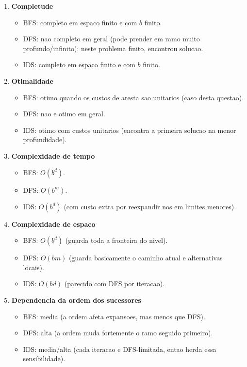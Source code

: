 \begin{enumerate}[label=\alph*)]
  \item \textbf{Completude}
  \begin{itemize}[leftmargin=1.5em]
    \item BFS: completo em espaco finito e com $b$ finito.
    \item DFS: nao completo em geral (pode prender em ramo muito profundo/infinito); neste problema finito, encontrou solucao.
    \item IDS: completo em espaco finito e com $b$ finito.
  \end{itemize}

  \item \textbf{Otimalidade}
  \begin{itemize}[leftmargin=1.5em]
    \item BFS: otimo quando os custos de aresta sao unitarios (caso desta questao).
    \item DFS: nao e otimo em geral.
    \item IDS: otimo com custos unitarios (encontra a primeira solucao na menor profundidade).
  \end{itemize}

  \item \textbf{Complexidade de tempo}
  \begin{itemize}[leftmargin=1.5em]
    \item BFS: $O(b^d)$.
    \item DFS: $O(b^m)$.
    \item IDS: $O(b^d)$ (com custo extra por reexpandir nos em limites menores).
  \end{itemize}

  \item \textbf{Complexidade de espaco}
  \begin{itemize}[leftmargin=1.5em]
    \item BFS: $O(b^d)$ (guarda toda a fronteira do nivel).
    \item DFS: $O(bm)$ (guarda basicamente o caminho atual e alternativas locais).
    \item IDS: $O(bd)$ (parecido com DFS por iteracao).
  \end{itemize}

  \item \textbf{Dependencia da ordem dos sucessores}
  \begin{itemize}[leftmargin=1.5em]
    \item BFS: media (a ordem afeta expansoes, mas menos que DFS).
    \item DFS: alta (a ordem muda fortemente o ramo seguido primeiro).
    \item IDS: media/alta (cada iteracao e DFS-limitada, entao herda essa sensibilidade).
  \end{itemize}


\end{enumerate}

